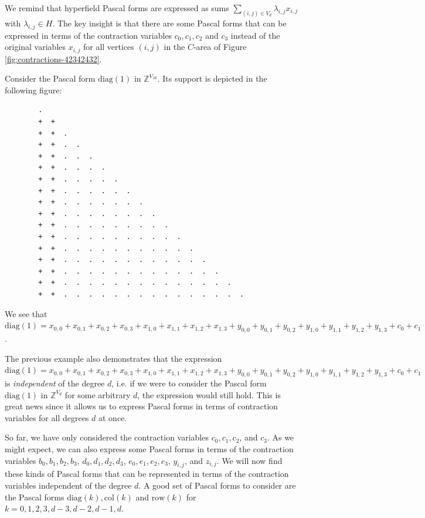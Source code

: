 We remind that hyperfield Pascal forms are expressed as sums \( \sum_{(i,j) \in V_d} \lambda_{i,j} x_{i,j} \) with \( \lambda_{i,j} \in H \). The key insight is that there are some Pascal forms that can be expressed in terms of the contraction variables \( c_0 , c_1, c_2\) and \( c_3 \) instead of the original variables \( x_{i,j} \) for all vertices \( (i,j) \) in the \( C \)-area of Figure \ref{fig:contractions-42342432}.

\begin{example}
    Consider the Pascal form \( \mathrm{diag}(1) \) in \( \mathbb{Z}^{V_{16}} \). Its support is depicted in the following figure:
    \begin{verbatim}
        .
        +  +
        +  +  . 
        +  +  .  .  
        +  +  .  .  .  
        +  +  .  .  .  .  
        +  +  .  .  .  .  .  
        +  +  .  .  .  .  .  .  
        +  +  .  .  .  .  .  .  .
        +  +  .  .  .  .  .  .  .  .  
        +  +  .  .  .  .  .  .  .  .  .
        +  +  .  .  .  .  .  .  .  .  .  .
        +  +  .  .  .  .  .  .  .  .  .  .  .
        +  +  .  .  .  .  .  .  .  .  .  .  .  .
        +  +  .  .  .  .  .  .  .  .  .  .  .  .  .
        +  +  .  .  .  .  .  .  .  .  .  .  .  .  .  .
        +  +  .  .  .  .  .  .  .  .  .  .  .  .  .  .  .
    \end{verbatim}
    We see that \( \mathrm{diag}(1) = x_{0,0} + x_{0,1} + x_{0,2} + x_{0,3} + x_{1,0} + x_{1,1} + x_{1,2} + x_{1,3} + y_{0,0} + y_{0,1} + y_{0,2} + y_{1,0} + y_{1,1} + y_{1,2} + y_{1,3} + c_0 + c_1\).
\end{example}

The previous example also demonstrates that the expression \( \mathrm{diag}(1) = x_{0,0} + x_{0,1} + x_{0,2} + x_{0,3} + x_{1,0} + x_{1,1} + x_{1,2} + x_{1,3} + y_{0,0} + y_{0,1} + y_{0,2} + y_{1,0} + y_{1,1} + y_{1,2} + y_{1,3} + c_0 + c_1 \) is \emph{independent} of the degree \( d \), i.e. if we were to consider the Pascal form \( \mathrm{diag}(1) \) in \( \mathbb{Z}^{V_{d}} \) for some arbitrary \( d \), the expression would still hold. This is great news since it allows us to express Pascal forms in terms of contraction variables for all degrees \( d \) at once.

So far, we have only considered the contraction variables \( c_0, c_1, c_2 \), and \( c_3 \). As we might expect, we can also express some Pascal forms in terms of the contraction variables \( b_0, b_1, b_2, b_3 \), \( d_0, d_1, d_2, d_3 \), \( e_0, e_1, e_2, e_3 \), \( y_{i,j} \), and \( z_{i,j} \). We will now find these kinds of Pascal forms that can be represented in terms of the contraction variables independent of the degree \( d \). A good set of Pascal forms to consider are the Pascal forms \( \mathrm{diag}(k),  \mathrm{col}(k) \) and \( \mathrm{row}(k) \) for \( k = 0,1,2,3,d-3,d-2,d-1,d \).

